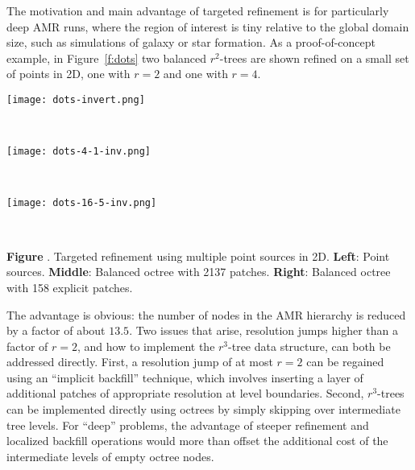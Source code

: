 \documentclass[11pt,letterpaper]{article}
\newcounter{figctr}
\newcommand{\FIGURE}[3]{
\noindent
\parbox{\textwidth}{
\begin{center}
#3
\end{center}%
\ \nolinebreak%
\refstepcounter{figctr}%
\begin{center}%
\begin{minipage}{7.0in}
\textbf{Figure \thefigctr}. #1
\end{minipage}
\end{center}
\label{#2}
}}
\begin{document}
The motivation and main advantage of targeted refinement is for
particularly deep AMR runs, where the region of interest is tiny
relative to the global domain size, such as simulations of galaxy or
star formation.  As a proof-of-concept example, in Figure~\ref{f:dots}
two balanced $r^2$-trees are shown refined on a small set of points in 2D, one
with $r=2$ and one with $r=4$.


\FIGURE{
Targeted refinement using multiple point sources in 2D.
 \textbf{Left}: Point sources.  
 \textbf{Middle}: Balanced octree with 2137 patches.
 \textbf{Right}: Balanced octree with 158 explicit patches.
}
{f:dots}{
\begin{minipage}{7.0in}
\begin{minipage}{2.2in}
\texttt{[image: dots-invert.png]}
\end{minipage} \ 
\begin{minipage}{2.2in}
\texttt{[image: dots-4-1-inv.png]}
\end{minipage} \ 
\begin{minipage}{2.2in}
\texttt{[image: dots-16-5-inv.png]}
\end{minipage}
\end{minipage}}

The advantage is obvious: the number of nodes in the AMR hierarchy is
reduced by a factor of about \textit{$13.5$}.  Two issues that arise,
resolution jumps higher than a factor of $r=2$, and how to implement
the $r^3$-tree data structure, can both be addressed directly.  First,
a resolution jump of at most $r=2$ can be regained using an ``implicit
backfill'' technique, which involves inserting a layer of additional
patches of appropriate resolution at level boundaries.  Second,
$r^3$-trees can be implemented directly using octrees by simply
skipping over intermediate tree levels.  For ``deep'' problems, the
advantage of steeper refinement and localized backfill operations
would more than offset the additional cost of the intermediate levels
of empty octree nodes.
\end{document}

